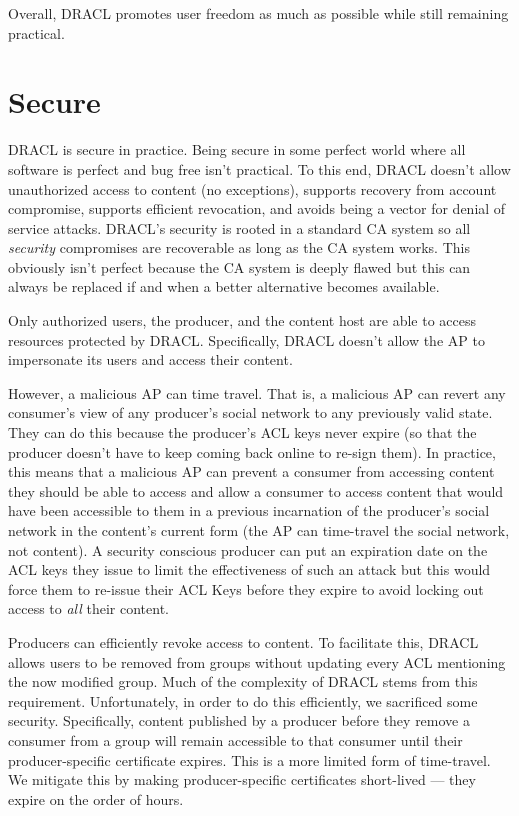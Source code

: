 \documentclass[pdftex,12pt,a4papaer,twoside,notitlepage]{report}
\begin{document}
Overall, DRACL promotes user freedom as much as possible while still remaining
practical.

\section{Secure}
\label{sec:secure}

DRACL is secure in practice. Being secure in some perfect world where all
software is perfect and bug free isn't practical. To this end, DRACL doesn't
allow unauthorized access to content (no exceptions), supports recovery from
account compromise, supports efficient revocation, and avoids being a vector for
denial of service attacks. DRACL's security is rooted in a standard CA system so
all \emph{security} compromises are recoverable as long as the CA system works.
This obviously isn't perfect because the CA system is deeply flawed but this can
always be replaced if and when a better alternative becomes available.

Only authorized users, the producer, and the content host are able to access
resources protected by DRACL\@. Specifically, DRACL doesn't allow the AP to
impersonate its users and access their content.

However, a malicious AP can time travel. That is, a malicious AP can revert any
consumer's view of any producer's social network to any previously valid state.
They can do this because the producer's ACL keys never expire (so that the
producer doesn't have to keep coming back online to re-sign them). In practice,
this means that a malicious AP can prevent a consumer from accessing content
they should be able to access and allow a consumer to access content that would
have been accessible to them in a previous incarnation of the producer's social
network in the content's current form (the AP can time-travel the social network,
not content). A security conscious producer can put an expiration date on
the ACL keys they issue to limit the effectiveness of such an attack but this
would force them to re-issue their ACL Keys before they expire to avoid locking
out access to \emph{all} their content.

Producers can efficiently revoke access to content. To facilitate this, DRACL
allows users to be removed from groups without updating every ACL mentioning the
now modified group. Much of the complexity of DRACL stems from this requirement.
Unfortunately, in order to do this efficiently, we sacrificed some security.
Specifically, content published by a producer before they remove a consumer from
a group will remain accessible to that consumer until their producer-specific
certificate expires. This is a more limited form of time-travel. We mitigate
this by making producer-specific certificates short-lived --- they expire on the
order of hours.
\end{document}
